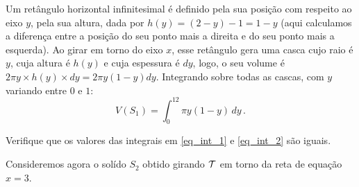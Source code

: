 \begin{ex}
\begin{center}
\begin{bmlimage}
\end{bmlimage}
\end{center}

Um retângulo horizontal infinitesimal 
é definido pela sua posição com respeito
ao eixo $y$, pela sua altura, dada por $h(y)=(2-y)-1=1-y$ (aqui
calculamos a diferença entre a posição do seu ponto mais a
direita e do seu ponto mais a esquerda). 
Ao girar em torno do eixo $x$, esse retângulo gera uma casca
cujo raio é $y$, cuja altura é $h(y)$ e cuja espessura é $dy$,
logo, o seu volume é $2\pi y \times h(y)\times dy=2\pi y(1-y)dy$. Integrando
sobre todas as cascas, com $y$ variando entre $0$ e $1$:
\begin{equation}\label{eq_int_2}
V(S_1)=\int_0^12\pi y (1-y)\,dy\,.
\end{equation}


\begin{exo}\label{exo:verificar}
Verifique que os valores das integrais em \eqref{eq_int_1} e \eqref{eq_int_2}
são iguais.
\end{exo}

Consideremos agora o solído $S_2$ obtido girando $\mathcal{T}$ em torno
da reta de equação $x=3$.

\begin{center}
\begin{bmlimage}
\end{bmlimage}
\end{center}
\end{ex}

